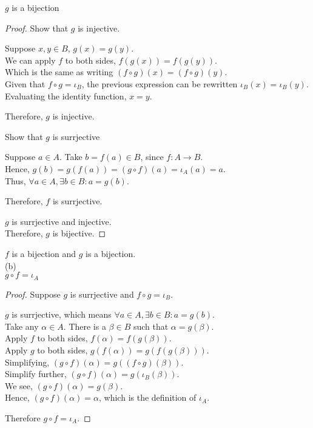 \documentclass[a4paper, 11pt]{report}
\begin{document}
\Propo $g$ is a bijection
\begin{proof}
  Show that $g$ is injective.
  \begin{list}{}{\setlength{\leftmargin}{1in}\setlength{\topsep}{0pt}}\item 
    Suppose $x,y\in B$, $g(x)=g(y)$. \\
    We can apply $f$ to both sides, $f(g(x)) = f(g(y))$. \\
    Which is the same as writing $(f\circ g)(x) = (f\circ g)(y)$. \\
    Given that $f\circ g=\iota_B$, the previous expression can be rewritten $\iota_B(x)=\iota_B(y)$. \\
    Evaluating the identity function, $x = y$.

    Therefore, $g$ is injective.
  \end{list}

  Show that $g$ is surrjective
  \begin{list}{}{\setlength{\leftmargin}{1in}\setlength{\topsep}{0pt}}\item 
    Suppose $a\in A$. Take $b=f(a)\in B$, since $f:A\to B$. \\
    Hence, $g(b)=g(f(a)) = (g\circ f)(a) = \iota_A(a) = a$. \\
    Thus, $\forall a\in A, \exists b\in B: a=g(b)$.

    Therefore, $f$ is surrjective. \\
  \end{list}
  
  $g$ is surrjective and injective. \\
  Therefore, $g$ is bijective.
\end{proof}

\Corol $f$ is a bijection and $g$ is a bijection. \\

\newpage
\sol (b) \\
\Propo $g\circ f = \iota_A$
\begin{proof}
  Suppose $g$ is surrjective and $f\circ g = \iota_B$.
  \begin{list}{}{\setlength{\leftmargin}{1in}\setlength{\topsep}{2pt}}\item 
    $g$ is surrjective, which means $\forall a\in A, \exists b\in B: a=g(b)$. \\
    Take any $\alpha\in A$. There is a $\beta\in B$ such that $\alpha=g(\beta)$. \\
    Apply $f$ to both sides, $f(\alpha) = f(g(\beta))$. \\
    Apply $g$ to both sides, $g(f(\alpha)) = g(f(g(\beta)))$. \\
    Simplifying, $(g\circ f)(\alpha) = g((f\circ g)(\beta))$. \\
    Simplify further, $(g\circ f)(\alpha) = g(\iota_B(\beta))$. \\
    We see, $(g\circ f)(\alpha) = g(\beta)$. \\
    Hence, $(g\circ f)(\alpha) = \alpha$, which is the definition of $\iota_A$.
  \end{list}
  Therefore $g\circ f = \iota_A$.
\end{proof}
\end{document}
